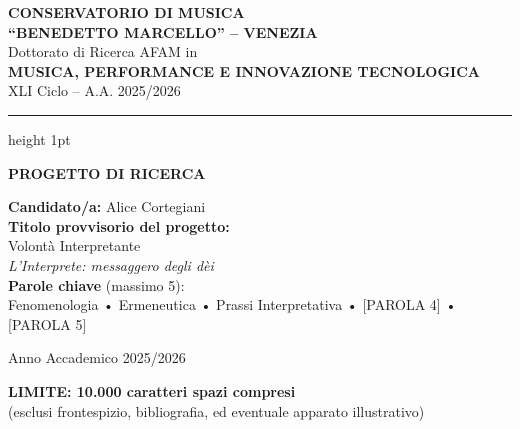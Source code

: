\documentclass[a4paper,12pt]{article}
\begin{document}
\thispagestyle{empty}
\begin{center}
    \vspace*{2cm}

    {\Large\textbf{CONSERVATORIO DI MUSICA}}\\[0.3cm]
    {\Large\textbf{``BENEDETTO MARCELLO'' -- VENEZIA}}\\[1.5cm]

    {\large Dottorato di Ricerca AFAM in}\\[0.5cm]
    {\LARGE\textbf{\textcolor{vinaccia}{MUSICA, PERFORMANCE E INNOVAZIONE TECNOLOGICA}}}\\[0.3cm]
    {\large XLI Ciclo -- A.A. 2025/2026}\\[2cm]

    \hrule height 1pt
    \vspace{0.5cm}

    {\Large\textbf{PROGETTO DI RICERCA}}\\[1.5cm]

    \begin{center}
    \textbf{Candidato/a:} Alice Cortegiani\\[1cm]

    \textbf{Titolo provvisorio del progetto:}\\[0.3cm]
    {\large Volontà Interpretante \\ \emph{L'Interprete: messaggero degli dèi}}\\[1.2cm]

    \textbf{Parole chiave} (massimo 5):\\[0.3cm]
    Fenomenologia • Ermeneutica • Prassi Interpretativa • [PAROLA 4] • [PAROLA 5]\\[1cm]
    \end{center}

    \vfill

    {\large Anno Accademico 2025/2026}
\end{center}

\newpage

\setcounter{page}{1}

\begin{center}
{\textcolor{vinaccia}{\textbf{\large LIMITE: 10.000 caratteri spazi compresi}}}\\
{\small (esclusi frontespizio, bibliografia, ed eventuale apparato illustrativo)}
\end{center}

\vspace{1cm}
\end{document}
